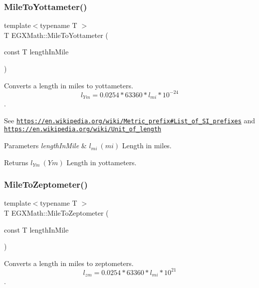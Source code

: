 \subsubsection{\texorpdfstring{Mile\+To\+Yottameter()}{MileToYottameter()}}
{\footnotesize\ttfamily template$<$typename T $>$ \\
T E\+G\+X\+Math\+::\+Mile\+To\+Yottameter (\begin{DoxyParamCaption}\item[{const T}]{length\+In\+Mile }\end{DoxyParamCaption})}



Converts a length in miles to yottameters. \[ l_{Ym}=0.0254 * 63360 * l_{mi} * 10^{-24} \]. 

See \href{https://en.wikipedia.org/wiki/Metric_prefix#List_of_SI_prefixes}{\tt https\+://en.\+wikipedia.\+org/wiki/\+Metric\+\_\+prefix\#\+List\+\_\+of\+\_\+\+S\+I\+\_\+prefixes} and \href{https://en.wikipedia.org/wiki/Unit_of_length}{\tt https\+://en.\+wikipedia.\+org/wiki/\+Unit\+\_\+of\+\_\+length} 
\begin{DoxyParams}{Parameters}
{\em length\+In\+Mile} & $ l_{mi}\ (mi)$ Length in miles. \\
\hline
\end{DoxyParams}
\begin{DoxyReturn}{Returns}
$ l_{Ym}\ (Ym)$ Length in yottameters. 
\end{DoxyReturn}
\mbox{\label{group___e_g_x_math-_conversions-_length_conversions-_imperial-_mile-_s_i_gaa9bfa89d95751e47208d10259bc7ac9c}} 
\subsubsection{\texorpdfstring{Mile\+To\+Zeptometer()}{MileToZeptometer()}}
{\footnotesize\ttfamily template$<$typename T $>$ \\
T E\+G\+X\+Math\+::\+Mile\+To\+Zeptometer (\begin{DoxyParamCaption}\item[{const T}]{length\+In\+Mile }\end{DoxyParamCaption})}



Converts a length in miles to zeptometers. \[ l_{zm}=0.0254 * 63360 * l_{mi} * 10^{21} \]. 


